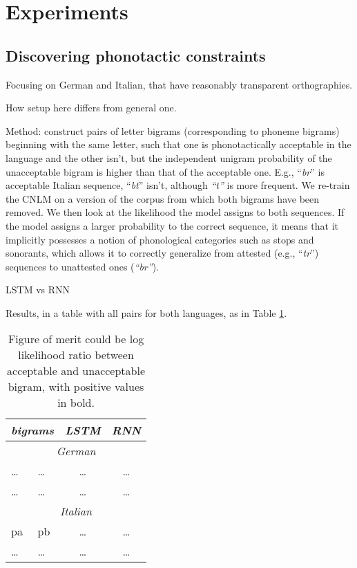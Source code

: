 \section{Experiments}
\label{sec:experiments}

\subsection{Discovering phonotactic constraints}
\label{sec:phonotactics}

Focusing on German and Italian, that have reasonably transparent
orthographies.

How setup here differs from general one.

Method: construct pairs of letter bigrams (corresponding to phoneme
bigrams) beginning with the same letter, such that one is
phonotactically acceptable in the language and the other isn't, but
the independent unigram probability of the unacceptable bigram is
higher than that of the acceptable one. E.g., ``\emph{br}'' is
acceptable Italian sequence, ``\emph{bt}'' isn't, although
\emph{``t''} is more frequent. We re-train the CNLM on a version of
the corpus from which both bigrams have been removed. We then look at
the likelihood the model assigns to both sequences. If the model
assigns a larger probability to the correct sequence, it means that it
implicitly possesses a notion of phonological categories such as
stops and sonorants, which allows it to correctly generalize from
attested (e.g., ``\emph{tr}'') sequences to unattested ones
(\emph{``br''}).

LSTM vs RNN

Results, in a table with all pairs for both languages, as in Table
\ref{tab:phonotactics-results}.

\begin{table}[t]
  \begin{center}
    \begin{tabular}{ll|cc}
      \multicolumn{2}{c}{\emph{bigrams}}&\emph{LSTM}&\emph{RNN}\\
      \hline
      \multicolumn{4}{c}{\emph{German}}\\
      \hline
      \ldots & \ldots & \ldots & \ldots \\
      \ldots & \ldots & \ldots & \ldots \\
      \hline
      \multicolumn{4}{c}{\emph{Italian}}\\
      \hline
      pa & pb & \ldots & \ldots \\
      \ldots & \ldots & \ldots & \ldots \\
    \end{tabular}
  \end{center}
  \caption{\label{tab:phonotactics-results} Figure of merit could be
    log likelihood ratio between acceptable and unacceptable bigram,
    with positive values in bold.}
\end{table}


